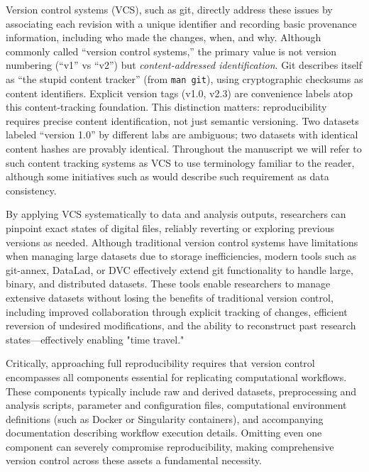 \documentclass{article}
\begin{document}
Version control systems (VCS), such as git, directly address these issues by associating each revision with a unique identifier and recording basic provenance information, including who made the changes, when, and why.
Although commonly called ``version control systems,'' the primary value is not version numbering (``v1'' vs ``v2'') but \emph{content-addressed identification}.
Git describes itself as ``the stupid content tracker'' (from \texttt{man git}), using cryptographic checksums as content identifiers.
Explicit version tags (v1.0, v2.3) are convenience labels atop this content-tracking foundation.
This distinction matters: reproducibility requires precise content identification, not just semantic versioning.
Two datasets labeled ``version 1.0'' by different labs are ambiguous; two datasets with identical content hashes are provably identical.
Throughout the manuscript we will refer to such content tracking systems as VCS to use terminology familiar to the reader, although some initiatives such as \cite{johnson_sciops_2024} would describe such requirement as data consistency.

By applying VCS systematically to data and analysis outputs, researchers can pinpoint exact states of digital files, reliably reverting or exploring previous versions as needed.
Although traditional version control systems have limitations when managing large datasets due to storage inefficiencies, modern tools such as git-annex, DataLad, or DVC effectively extend git functionality to handle large, binary, and distributed datasets.
These tools enable researchers to manage extensive datasets without losing the benefits of traditional version control, including improved collaboration through explicit tracking of changes, efficient reversion of undesired modifications, and the ability to reconstruct past research states—effectively enabling "time travel."

Critically, approaching full reproducibility requires that version control encompasses all components essential for replicating computational workflows.
These components typically include raw and derived datasets, preprocessing and analysis scripts, parameter and configuration files, computational environment definitions (such as Docker or Singularity containers), and accompanying documentation describing workflow execution details.
Omitting even one component can severely compromise reproducibility, making comprehensive version control across these assets a fundamental necessity.

\end{document}
